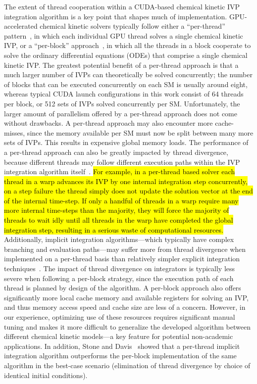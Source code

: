 \documentclass[preprint,review,11pt]{elsarticle}
\DeclareRobustCommand{\hlg}[1]{\sethlcolor{green}\hl{#1}}
\DeclareRobustCommand{\hlg}[1]{\empty{#1}}
\begin{document}
The extent of thread cooperation within a CUDA-based chemical kinetic IVP integration algorithm is a key point that shapes much of implementation.
GPU-accelerated chemical kinetic solvers typically follow either a ``per-thread'' pattern~\cite{Niemeyer:2011aa,Stone:2013aa,Niemeyer:2014aa}, in which each individual GPU thread solves a single chemical kinetic IVP, or a ``per-block'' approach~\cite{Stone:2013aa,Sewerin20151375}, in which all the threads in a block cooperate to solve the ordinary differential equations (ODEs) that comprise a single chemical kinetic IVP.
The greatest potential benefit of a per-thread approach is that a much larger number of IVPs can theoretically be solved concurrently; the number of blocks that can be executed concurrently on each SM is usually around eight, whereas typical CUDA launch configurations in this work consist of 64 threads per block, or 512 sets of IVPs solved concurrently per SM.
Unfortunately, the larger amount of parallelism offered by a per-thread approach does not come without drawbacks.
A per-thread approach may also encounter more cache-misses, since the memory available per SM must now be split between many more sets of IVPs.
This results in expensive global memory loads.
The performance of a per-thread approach can also be greatly impacted by thread divergence, because different threads may follow different execution paths within the IVP integration algorithm itself~\cite{Stone:2013aa,Niemeyer:2014aa}.
\hlg{For example, in a per-thread based solver each thread in a warp advances its IVP by one internal integration step concurrently, on a step failure the thread simply does not update the solution vector at the end of the internal time-step. 
If only a handful of threads in a warp require many more internal time-steps than the majority, they will force the majority of threads to wait idly until all threads in the warp have completed the global integration step, resulting in a serious waste of computational resources.}
Additionally, implicit integration algorithms---which typically have complex branching and evaluation paths---may suffer more from thread divergence when implemented on a per-thread basis than relatively simpler explicit integration techniques~\cite{Stone:2013aa}.
The impact of thread divergence on integrators is typically less severe when following a per-block strategy, since the execution path of each thread is planned by design of the algorithm.
A per-block approach also offers significantly more local cache memory and available registers for solving an IVP, and thus memory access speed and cache size are less of a concern.
However, in our experience, optimizing use of these resources requires significant manual tuning and makes it more difficult to generalize the developed algorithm between different chemical kinetic models---a key feature for potential non-academic applications.
In addition, Stone and Davis~\cite{Stone:2013aa} showed that a per-thread implicit integration algorithm outperforms the per-block implementation of the same algorithm in the best-case scenario (elimination of thread divergence by choice of identical initial conditions).
\end{document}
